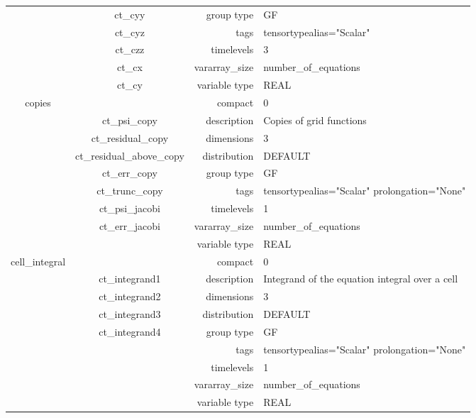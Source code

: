 \begin{tabular*}{150mm}{|c|c@{\extracolsep{\fill}}|rl|}
 & ct\_cyy & group type & GF \\ 
 & ct\_cyz & tags & tensortypealias="Scalar" \\ 
 & ct\_czz & timelevels & 3 \\ 
 & ct\_cx & vararray\_size & number\_of\_equations \\ 
 & ct\_cy & variable type & REAL \\ 
\hline 
copies &  & compact & 0 \\ 
 & ct\_psi\_copy & description & Copies of grid functions \\ 
 & ct\_residual\_copy & dimensions & 3 \\ 
 & ct\_residual\_above\_copy & distribution & DEFAULT \\ 
 & ct\_err\_copy & group type & GF \\ 
 & ct\_trunc\_copy & tags & tensortypealias="Scalar" prolongation="None" \\ 
 & ct\_psi\_jacobi & timelevels & 1 \\ 
 & ct\_err\_jacobi & vararray\_size & number\_of\_equations \\ 
 &  & variable type & REAL \\ 
\hline 
cell\_integral &  & compact & 0 \\ 
 & ct\_integrand1 & description & Integrand of the equation integral over a cell \\ 
 & ct\_integrand2 & dimensions & 3 \\ 
 & ct\_integrand3 & distribution & DEFAULT \\ 
 & ct\_integrand4 & group type & GF \\ 
 &  & tags & tensortypealias="Scalar" prolongation="None" \\ 
 &  & timelevels & 1 \\ 
 &  & vararray\_size & number\_of\_equations \\ 
 &  & variable type & REAL \\ 
\hline 
\end{tabular*} 



\vspace{5mm}
\vspace{5mm}

